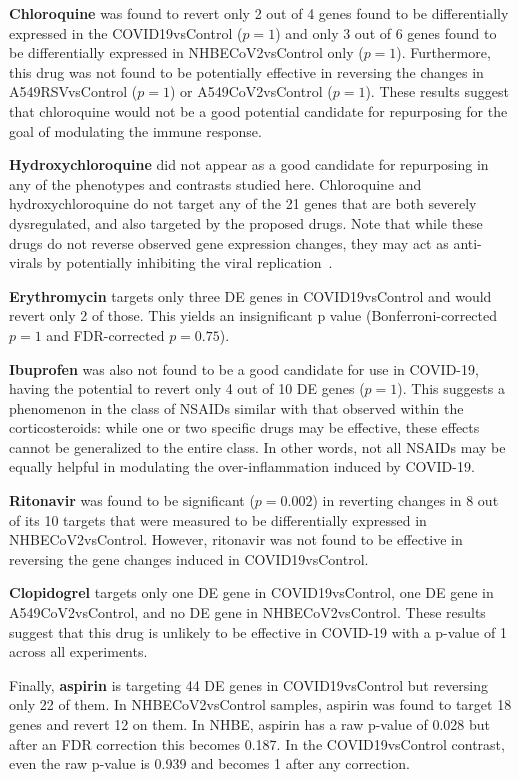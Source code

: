 \documentclass[Minh_PhD_thesis.tex]{subfiles}
\begin{document}
\textbf{Chloroquine} was found to revert only 2 out of 4 genes found to be differentially expressed in the COVID19vsControl ($p=1$) and only 3 out of 6 genes found to be differentially expressed in NHBECoV2vsControl only ($p=1$). Furthermore, this drug was not found to be potentially effective in reversing the changes in A549RSVvsControl ($p=1$)  or A549CoV2vsControl ($p=1$). These results suggest that  chloroquine would not be a good potential candidate for repurposing for the goal of modulating the immune response.  

\textbf{Hydroxychloroquine}  did not appear as a good candidate for repurposing in any of the phenotypes and contrasts studied here. 
Chloroquine and hydroxychloroquine do not target any of the 21 genes that are both severely dysregulated, and also targeted by the proposed drugs. Note that while these drugs do not reverse observed gene expression changes, they may act as anti-virals by potentially inhibiting the viral replication~\cite{sanders2020pharmacologic}.

\textbf{Erythromycin}  targets only three DE genes in COVID19vsControl  and would revert only 2 of those. This yields an insignificant p value (Bonferroni-corrected $p=1$ and FDR-corrected $p=0.75$). 

\textbf{Ibuprofen} was also not found to be a good candidate for use in COVID-19, having the potential to revert only 4 out of 10 DE genes ($p=1$). This suggests a  phenomenon in the class of NSAIDs similar with that observed within the corticosteroids: while one or two specific drugs may be effective, 
these effects cannot be generalized to the entire class. 
In other words, not all NSAIDs may be equally helpful in modulating the over-inflammation induced by COVID-19. 

\textbf{Ritonavir} was found to be significant ($p=0.002$) in reverting changes in 8 out of its 10 targets that were measured to be differentially expressed in NHBECoV2vsControl. However, ritonavir was not found to be effective in reversing the gene changes induced in COVID19vsControl.

\textbf{Clopidogrel} targets only one DE gene in COVID19vsControl, one DE gene in A549CoV2vsControl, and no DE gene in NHBECoV2vsControl. These results suggest that this drug is unlikely to be effective in COVID-19 with a p-value of 1 across all experiments. 
 
 Finally, \textbf{aspirin}  is targeting 44  DE genes in COVID19vsControl but  reversing only 22 of them. In NHBECoV2vsControl samples, aspirin was found to target 18 genes and revert 12 on them. In NHBE, aspirin has a raw p-value of 0.028 but after an FDR correction this becomes 0.187. In the COVID19vsControl contrast, even the raw p-value is 0.939 and  becomes 1 after any correction. 
 
\end{document}
